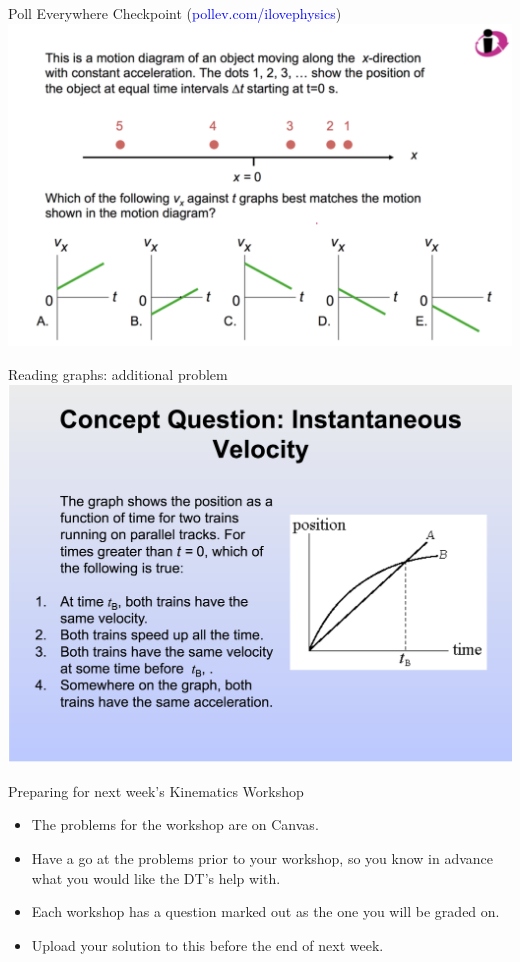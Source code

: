 \begin{frame}{Poll Everywhere Checkpoint (\textcolor{blue}{pollev.com/ilovephysics})}
\notsotiny
\includegraphics[scale=0.4]{GraphQuiz}

\end{frame}

\begin{frame}{Reading graphs: additional problem}
\notsotiny
\includegraphics[scale=0.3]{NickedFromMIT}

\end{frame}



\begin{frame}{Preparing for next week's Kinematics Workshop}
\small
\begin{itemize}
\item The problems for the workshop are on Canvas.
\item Have a go at the problems prior to your workshop, so you know in advance what you would like the DT's help with.
\item Each workshop has a question marked out as the one you will be graded on.
\item Upload your solution to this before the end of next week.
\end{itemize}
\end{frame}


